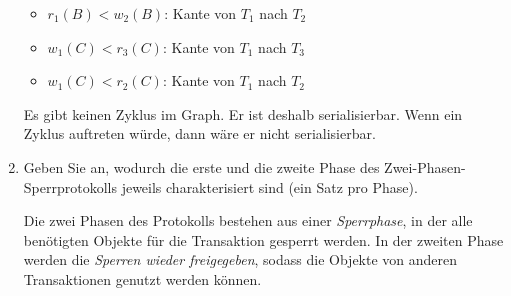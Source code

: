 \documentclass{bschlangaul-aufgabe}
\begin{document}
\begin{enumerate}
\begin{bAntwort}

\begin{itemize}
\item $r_1 (B) < w_2 (B)$: Kante von $T_1$ nach $T_2$
\item $w_1 (C) < r_3 (C)$: Kante von $T_1$ nach $T_3$
\item $w_1 (C) < r_2 (C)$: Kante von $T_1$ nach $T_2$
\end{itemize}


\begin{center}
\end{center}

Es gibt keinen Zyklus im Graph. Er ist deshalb serialisierbar. Wenn ein
Zyklus auftreten würde, dann wäre er nicht serialisierbar.
\end{bAntwort}


\item Geben Sie an, wodurch die erste und die zweite Phase des
Zwei-Phasen-Sperrprotokolls jeweils
charakterisiert sind (ein Satz pro Phase).

\begin{bAntwort}
Die zwei Phasen des Protokolls bestehen aus einer \emph{Sperrphase}, in der
alle benötigten Objekte für die Transaktion gesperrt werden. In der
zweiten Phase werden die \emph{Sperren wieder freigegeben}, sodass die
Objekte von anderen Transaktionen genutzt werden können.
\end{bAntwort}

\end{enumerate}
\end{document}
